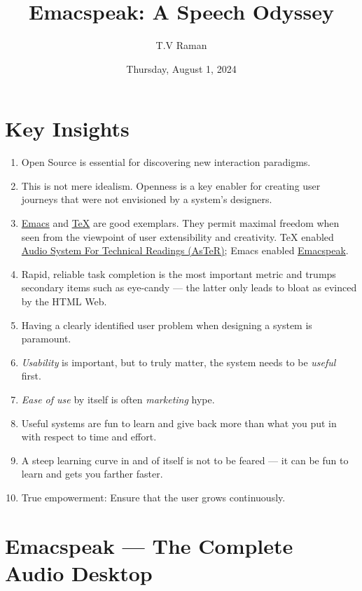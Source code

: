 \documentclass[11pt]{article}
\author{T.V Raman}
\date{Thursday, August 1, 2024}
\title{Emacspeak:  A Speech Odyssey}
\begin{document}
\maketitle
\tableofcontents

\section{Key Insights}
\label{sec:org88f7db2}

\begin{enumerate}
\item Open Source is essential  for discovering new interaction paradigms.
\item This is not mere idealism.  Openness is a key enabler for
creating   user journeys that were not  envisioned by a 
system's designers.
\item \href{https://www.gnu.org/s/emacs/}{Emacs} and  \href{https://en.wikipedia.org/wiki/TeX}{\TeX{}}    are good exemplars. They  permit maximal freedom
 when seen from the viewpoint of user extensibility and
creativity. \TeX{} enabled \href{https://emacspeak.blogspot.com/2022/12/aster-spoken-math-on-emacspeak-audio\_21.html}{Audio System For Technical Readings (AsTeR)}; Emacs enabled \href{https://emacspeak.sourceforge.net}{Emacspeak}.
\item Rapid, reliable task completion is the most important metric and
trumps secondary items such as eye-candy --- the latter only
leads to bloat as evinced by the HTML Web.
\item Having a clearly identified user problem when designing a system
is paramount.
\item \emph{Usability} is important, but to  truly matter, the
system needs to be \emph{useful} first.
\item \emph{Ease of use} by   itself is often \emph{marketing} hype.
\item Useful systems are fun to learn and give back more than what you put
in with respect to time and effort.
\item A steep learning curve in and of itself is not to be feared --- it
can be fun to learn and  gets you farther faster.
\item True empowerment: Ensure that the user grows continuously.
\end{enumerate}
\section{Emacspeak --- The Complete Audio Desktop}
\label{sec:org4bd3f40}
\end{document}

